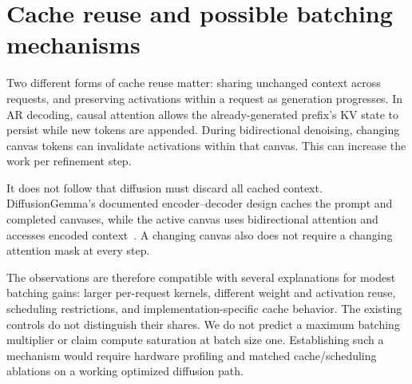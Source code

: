 \section{Cache reuse and possible batching mechanisms}
\label{app:batching_architectural}

Two different forms of cache reuse matter: sharing unchanged context
across requests, and preserving activations within a request as generation
progresses. In AR decoding, causal attention allows the already-generated
prefix's KV state to persist while new tokens are appended. During
bidirectional denoising, changing canvas tokens can invalidate activations
within that canvas. This can increase the work per refinement step.

It does not follow that diffusion must discard all cached context.
DiffusionGemma's documented encoder--decoder design caches the prompt and
completed canvases, while the active canvas uses bidirectional attention
and accesses encoded context~\cite{diffusiongemma}. A changing canvas
also does not require a changing attention mask at every step.

The observations are therefore compatible with several explanations for
modest batching gains: larger per-request kernels, different weight and
activation reuse, scheduling restrictions, and implementation-specific
cache behavior. The existing controls do not distinguish their shares.
We do not predict a maximum batching multiplier or claim compute
saturation at batch size one. Establishing such a mechanism would require
hardware profiling and matched cache/scheduling ablations on a working
optimized diffusion path.
